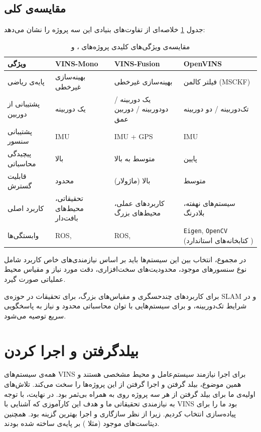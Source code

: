 \documentclass[11pt, a4paper]{article}
\begin{document}
	\subsection{مقایسه‌ی کلی}
	جدول \ref{tab:comparison} خلاصه‌ای از تفاوت‌های بنیادی این سه پروژه را نشان می‌دهد:
	
	\begin{table}[H]
		\centering
		\label{tab:comparison}
		\begin{tabular}{|p{6.5em}|p{7em}|p{9em}|p{9em}|}
			\hline
			\textbf{ویژگی} & \textbf{VINS-Mono} & \textbf{VINS-Fusion} & \textbf{OpenVINS} \\
			\hline
			پایه‌ی ریاضی & بهینه‌سازی غیرخطی & بهینه‌سازی غیرخطی & فیلتر کالمن (\gls{MSCKF}) \\
			\hline
			پشتیبانی از دوربین & یک دوربینه & یک دوربینه / دودوربینه / دوربین عمق & تک‌دوربینه / دو دوربینه \\
			\hline
			پشتیبانی سنسور & \gls{IMU} &  \gls{IMU} + GPS & \gls{IMU} \\
			\hline
			پیچیدگی محاسباتی & بالا & متوسط به بالا & پایین \\
			\hline
			قابلیت گسترش & محدود & بالا (ماژولار) & متوسط \\
			\hline
			کاربرد اصلی & تحقیقاتی، محیط‌های بافت‌دار & کاربردهای عملی، محیط‌های بزرگ & سیستم‌های نهفته، بلادرنگ \\
			\hline
			وابستگی‌ها &
			\gls{ROS}, \LR{\verb|ceres-solver|} & \gls{ROS}, \LR{\verb|ceres-solver|} & \verb|Eigen|, \verb|OpenCV| 
			(کتابخانه‌های استاندارد
			\LR{C++}) 
			\\
			\hline
		\end{tabular}
		\caption{مقایسه‌ی ویژگی‌های کلیدی پروژه‌های 
			،  و }
	\end{table}
	
	در مجموع، انتخاب بین این سیستم‌ها باید بر اساس نیازمندی‌های خاص کاربرد شامل نوع سنسورهای موجود، محدودیت‌های سخت‌افزاری، دقت مورد نیاز و مقیاس محیط عملیاتی صورت گیرد.
	
	 برای کاربردهای چندحسگری و مقیاس‌های بزرگ، 
	 برای تحقیقات در حوزه‌ی \gls{SLAM}
	و در شرایط تک‌دوربینه، و 
	 برای سیستم‌هایی با توان محاسباتی محدود و نیاز به پاسخگویی سریع توصیه می‌شود.
	
	
	\section{بیلدگرفتن و اجرا کردن }
	همه‌ی سیستم‌های \gls{VINS} برای اجرا نیازمند سیستم‌عامل و محیط مشخصی هستند و همین موضوع، بیلد گرفتن و اجرا گرفتن از این پروژه‌ها را سخت می‌کند. تلاش‌های اولیه‌ی ما برای بیلد گرفتن از هر سه پروژه روی 
	به همراه
	بی‌ثمر بود.
	در نهایت، با توجه به نیازمندی تحقیقاتی ما و هدف این کارآموزی که آشنایی با 
	\gls{VINS}
	بود ما 
	را برای پیاده‌سازی انتخاب کردیم. زیرا از نظر سازگاری و اجرا بهترین گزینه بود. همچنین دیتاست‌های موجود 
	(مثلا 
	)
	بر پایه‌ی
	ساخته شده بودند.
	
\end{document}
